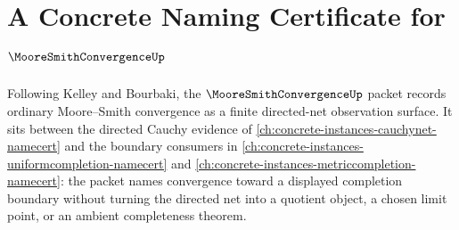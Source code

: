 \chapter{A Concrete Naming Certificate for $\MooreSmithConvergenceUp$}
\label{ch:concrete-instances-mooresmithconvergence-namecert}

Following Kelley and Bourbaki, the $\MooreSmithConvergenceUp$ packet records ordinary Moore--Smith convergence as a finite directed-net observation surface. It sits between the directed Cauchy evidence of \autoref{ch:concrete-instances-cauchynet-namecert} and the boundary consumers in \autoref{ch:concrete-instances-uniformcompletion-namecert} and \autoref{ch:concrete-instances-metriccompletion-namecert}: the packet names convergence toward a displayed completion boundary without turning the directed net into a quotient object, a chosen limit point, or an ambient completeness theorem.

